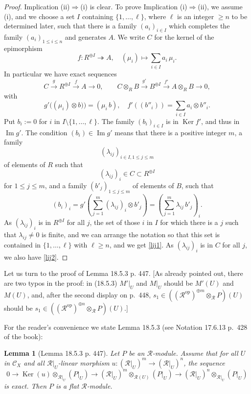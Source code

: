 \documentclass[12pt]{article}
\newtheorem{lem}[thm]{Lemma}
\theoremstyle{remark}
\theoremstyle{definition}
\newcommand{\cc}{\mathcal}
\newcommand{\C}{\mathcal C}
\newcommand{\epi}{\twoheadrightarrow}
\newcommand{\then}{\Rightarrow}
\newcommand{\xr}{\xrightarrow}
\DeclareMathOperator{\Ima}{Im}
\DeclareMathOperator{\Ker}{Ker}
\DeclareMathOperator{\op}{op}
\begin{document}
\begin{proof} 
Implication (ii)$\then$(i) is clear. To prove Implication (i)$\then$(ii), we assume (i), and we choose a set $I$ containing $\{1,\dots,\ell\}$, where $\ell$ is an integer $\ge n$ to be determined later, such that there is a family $(a_i)_{i\in I}$ which completes the family $(a_i)_{1\le i\le n}$ and generates $A$. We write $C$ for the kernel of the epimorphism 
$$
f:R^{\oplus I}\epi A,\quad(\mu_i)\mapsto\sum_{i\in I}a_i\,\mu_i.
$$ 
In particular we have exact sequences 
$$
C\xr gR^{\oplus I}\xr fA\to0,\qquad C\otimes_RB\xr{g'}B^{\oplus I}\xr{f'}A\otimes_RB\to0,
$$ 
with 
$$
g'\big((\mu_i)\otimes b)\big)=(\mu_i\,b),\quad f'((b''_i))=\sum_{i\in I}a_i\otimes b''_i.
$$
Put $b_i:=0$ for $i$ in $I\setminus\{1,\dots,\ell\}$. The family $(b_i)_{i\in I}$ is in $\Ker f'$, and thus in $\Ima g'$. The condition $(b_i)\in\Ima g'$ means that there is a positive integer $m$, a family 
$$
(\lambda_{ij})_{i\in I,1\le j\le m}
$$ 
of elements of $R$ such that 
$$
(\lambda_{ij})_i\in C\subset R^{\oplus I}
$$ 
for $1\le j\le m$, and a family $(b'_j)_{1\le j\le m}$ of elements of $B$, such that 
$$
(b_i)_i=g'
\left(\sum_{j=1}^m(\lambda_{ij})_i\otimes b'_j\right)=
\left(\sum_{j=1}^m\lambda_{ij}\,b'_j\right)_i.
$$ 
As $(\lambda_{ij})_i$ is in $R^{\oplus I}$ for all $j$, the set of those $i$ in $I$ for which there is a $j$ such that $\lambda_{ij}\neq0$ is finite, and we can arrange the notation so that this set is contained in $\{1,\dots,\ell\}$ with $\ell\ge n$, and we get \eqref{lij1}. As $(\lambda_{ij})_i$ is in $C$ for all $j$, we also have \eqref{lij2}. 
\end{proof}

Let us turn to the proof of Lemma 18.5.3 p. 447. [As already pointed out, there are two typos in the proof: in (18.5.3) $M'|_U$ and $M|_U$ should be $M'(U)$ and $M(U)$, and, after the second display on p.~448, $s_1\in((\cc R^{\op})^{\oplus m}\otimes_{\cc R}P)(U)$ should be $s_1\in((\cc R^{\op})^{\oplus n}\otimes_{\cc R}P)(U)$.] 

For the reader's convenience we state Lemma 18.5.3 (see Notation 17.6.13 p.~428 of the book): 

\begin{lem}[Lemma 18.5.3 p. 447]\label{l1853}
Let $P$ be an $\cc R$-module. Assume that for all $U$ in $\C_X$ and all $\cc R|_U$-linear morphism $u:(\cc R|_U)^m\to(\cc R|_U)^n$, the sequence 
$$
0\to\Ker(u)\otimes_{\cc R|_U}(P|_U)\to(\cc R|_U)^m\otimes_{\cc R(U)}(P|_U)\to(\cc R|_U)^n\otimes_{\cc R|_U}(P|_U)
$$ 
is exact. Then $P$ is a flat $\cc R$-module.
\end{lem}
\end{document}
